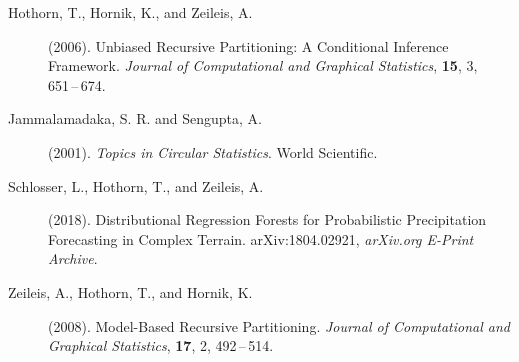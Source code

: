 \documentclass[twoside]{report}
\begin{document}
\begin{description}


\item[Hothorn, T., Hornik, K., and Zeileis, A.] (2006).
     Unbiased Recursive Partitioning: A Conditional Inference Framework.
     {\it Journal of Computational and Graphical Statistics}, {\bf 15}, 3,
     651\,--\,674. 

\item[Jammalamadaka, S. R. and Sengupta, A.] (2001).
     {\it Topics in Circular Statistics}.
     World Scientific. 



\item[Schlosser, L., Hothorn, T., and Zeileis, A.] (2018).
     Distributional Regression Forests for Probabilistic Precipitation Forecasting in Complex Terrain.
     arXiv:1804.02921, {\it arXiv.org E-Print Archive}.

\item[Zeileis, A., Hothorn, T., and Hornik, K.] (2008).
     Model-Based Recursive Partitioning.
     {\it Journal of Computational and Graphical Statistics}, {\bf 17}, 2,
     492\,--\,514. 
     

\end{description}
\end{document}
